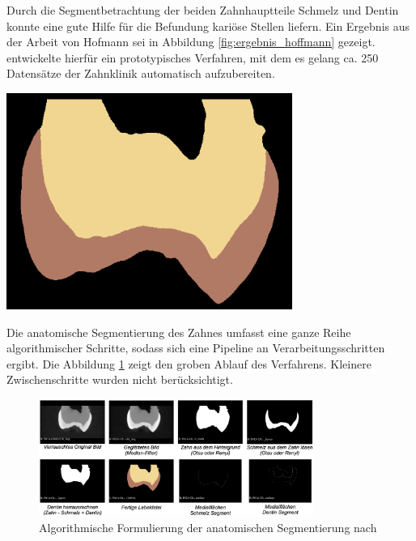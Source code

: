 \begin{minipage}{0.45\textwidth}
	Durch die Segmentbetrachtung der beiden Zahnhauptteile Schmelz und Dentin konnte
	\citet[S.~41]{hoffmann2020} eine gute Hilfe für die Befundung kariöse Stellen
	liefern. Ein Ergebnis aus der Arbeit von Hofmann sei in Abbildung \ref{fig:ergebnis_hoffmann}
	gezeigt. \citet[S.~53]{hoffmann2020} entwickelte hierfür ein prototypisches Verfahren,
	mit dem es gelang ca. 250 Datensätze der Zahnklinik automatisch aufzubereiten.
\end{minipage}
\hfill
\begin{minipage}{0.45\textwidth}
	\centering
	\includegraphics[width=0.7\textwidth]{img/ergebnis_hoffmann_2.jpg}
	\label{fig:ergebnis_hoffmann}
\end{minipage}

Die anatomische Segmentierung des Zahnes umfasst eine ganze Reihe algorithmischer
Schritte, sodass sich eine Pipeline an Verarbeitungsschritten ergibt. Die Abbildung
\ref{fig:anatomische_segmentierung} zeigt den groben Ablauf des Verfahrens.
Kleinere Zwischenschritte wurden nicht berücksichtigt.

\begin{figure}[h]
	\centering
	\includegraphics[width=0.8\textwidth]{img/anatomischeSegmentierung.png}
	\caption{Algorithmische Formulierung der anatomischen Segmentierung nach
	\citet{hoffmann2020}}
	\label{fig:anatomische_segmentierung}
\end{figure}

